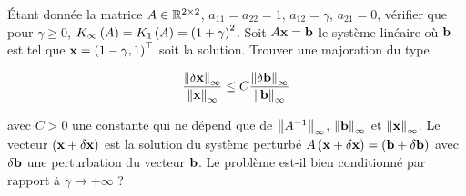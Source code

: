 Étant donnée la matrice $A \in \mathbb{R}^{2 \times 2}$, $a_{11} = a_{22} = 1$, $a_{12} = \gamma$, $a_{21} = 0$, vérifier que pour $\gamma \geq 0$, $K_{\infty} \left(A\right) = K_{1} \left(A\right) = \left(1 + \gamma\right)^{2}$.
Soit $A \mathbf{x} = \mathbf{b}$ le système linéaire où $\mathbf{b}$ est tel que $\mathbf{x} = \left(1 - \gamma, 1\right)^{\top}$ soit la solution.
Trouver une majoration du type 

\begin{equation*}
  \dfrac{\left\lVert\delta \mathbf{x}\right\rVert_{\infty}}{\left\lVert\mathbf{x}\right\rVert_{\infty}}
  \leq C \dfrac{\left\lVert\delta \mathbf{b}\right\rVert_{\infty}}{\left\lVert\mathbf{b}\right\rVert_{\infty}}
\end{equation*}

avec $C > 0$ une constante qui ne dépend que de $\left\lVert A^{-1}\right\rVert_{\infty}$, $\left\lVert\mathbf{b}\right\rVert_{\infty}$ et $\left\lVert\mathbf{x}\right\rVert_{\infty}$.
Le vecteur $\left(\mathbf{x} + \delta \mathbf{x}\right)$ est la solution du système perturbé $A \left(\mathbf{x} + \delta \mathbf{x}\right) = \left(\mathbf{b} + \delta \mathbf{b}\right)$ avec $\delta \mathbf{b}$ une perturbation du vecteur $\mathbf{b}$.
Le problème est-il bien conditionné par rapport à $\gamma \rightarrow + \infty$ ?